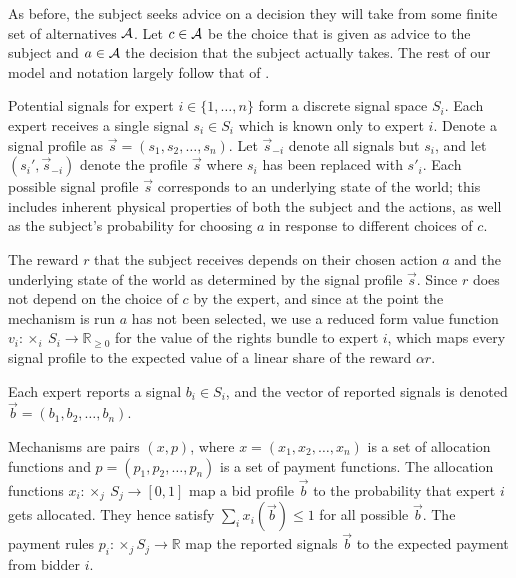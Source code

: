As before, the subject seeks advice on a decision they will take from some finite set of alternatives ${\mathcal A}$. Let $c\in{\mathcal A}$ be the choice that is given as advice to the subject and $a\in{\mathcal A}$ the decision that the subject actually takes.
The rest of our model and notation largely follow that of \cite{eden2018interdependent}. %

Potential signals for expert $i \in \{1, \ldots, n\}$ form a discrete signal space $S_i$.
Each expert receives a single signal $s_i\in S_i$ which is known only to expert $i$.
Denote a signal profile as $\vec{s}=(s_1,s_2,\ldots,s_n)$.
Let $\vec{s}_{-i}$ denote all signals but $s_i$, and let $(s_i',\vec{s}_{-i})$ denote the profile $\vec{s}$ where $s_i$ has been replaced with $s'_i$.
Each possible signal profile $\vec{s}$ corresponds to an underlying state of the world; this includes inherent physical properties of both the subject and the actions, as well as the subject's probability for choosing $a$ in response to different choices of $c$.

The reward $r$ that the subject receives depends on their chosen action $a$ and the underlying state of the world as determined by the signal profile $\vec{s}$.
Since $r$ does not depend on the choice of $c$ by the expert, and since at the point the mechanism is run $a$ has not been selected, we use a reduced form  value function $v_i: \times_i \ S_i \rightarrow \mathbb{R}_{\geq 0}$ for the value of the rights bundle to expert $i$, which maps every signal profile to the expected value of a linear share of the reward  $\alpha r$.


Each expert reports a signal $b_i\in S_i$, and the vector of reported signals is denoted $\vec{b}=( b_1, b_2, \ldots, b_n)$.

Mechanisms are pairs $(x,p)$, where $x=(x_1,x_2,\ldots,x_n)$ is a set of allocation functions and $p=(p_1,p_2,\ldots,p_n)$ is a set of payment functions.
The allocation functions $x_i:\times_j \ S_j\rightarrow [0,1]$ map a bid profile $\vec{b}$ to the probability that expert $i$ gets allocated. They hence satisfy $\sum_i x_i(\vec{b}) \leq 1$ for all possible $\vec{b}$.
The payment rules $p_i: \times _j S_j \rightarrow \mathbb R$ map the reported signals $\vec{b}$ to the expected payment from bidder $i$.

